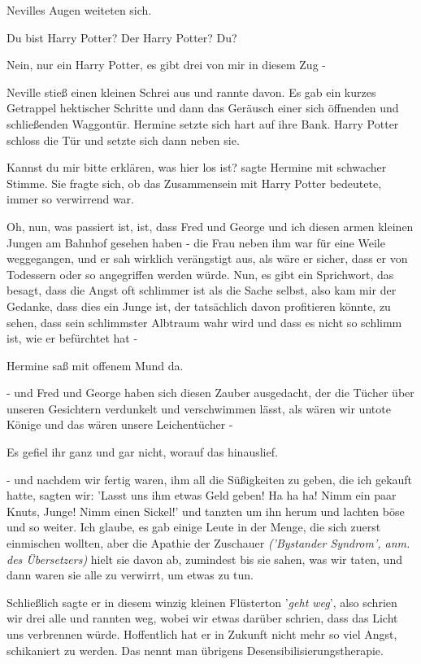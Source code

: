 Nevilles Augen weiteten sich.

\glqq{}Du bist Harry Potter? Der Harry Potter? Du?\grqq{}

\glqq{}Nein, nur ein Harry Potter, es gibt drei von mir in diesem Zug -\grqq{}

Neville stieß einen kleinen Schrei aus und rannte davon. Es gab ein kurzes
Getrappel hektischer Schritte und dann das Geräusch einer sich öffnenden und
schließenden Waggontür. Hermine setzte sich hart auf ihre Bank. Harry Potter
schloss die Tür und setzte sich dann neben sie.

\glqq{}Kannst du mir bitte erklären, was hier los ist?\grqq{} sagte Hermine mit
schwacher Stimme. Sie fragte sich, ob das Zusammensein mit Harry Potter
bedeutete, immer so verwirrend war.

\glqq{}Oh, nun, was passiert ist, ist, dass Fred und George und ich diesen armen
kleinen Jungen am Bahnhof gesehen haben - die Frau neben ihm war für eine Weile
weggegangen, und er sah wirklich verängstigt aus, als wäre er sicher, dass er
von Todessern oder so angegriffen werden würde. Nun, es gibt ein Sprichwort, das
besagt, dass die Angst oft schlimmer ist als die Sache selbst, also kam mir der
Gedanke, dass dies ein Junge ist, der tatsächlich davon profitieren könnte, zu
sehen, dass sein schlimmster Albtraum wahr wird und dass es nicht so schlimm
ist, wie er befürchtet hat -\grqq{}

Hermine saß mit offenem Mund da.

\glqq{}- und Fred und George haben sich diesen Zauber ausgedacht, der die Tücher
über unseren Gesichtern verdunkelt und verschwimmen lässt, als wären wir untote
Könige und das wären unsere Leichentücher -\grqq{}

Es gefiel ihr ganz und gar nicht, worauf das hinauslief.

\glqq{}- und nachdem wir fertig waren, ihm all die Süßigkeiten zu geben, die ich
gekauft hatte, sagten wir: 'Lasst uns ihm etwas Geld geben! Ha ha ha! Nimm ein
paar Knuts, Junge! Nimm einen Sickel!' und tanzten um ihn herum und lachten böse
und so weiter. Ich glaube, es gab einige Leute in der Menge, die sich zuerst
einmischen wollten, aber die Apathie der Zuschauer \emph{('Bystander Syndrom',
anm. des Übersetzers)} hielt sie davon ab, zumindest bis sie sahen, was wir
taten, und dann waren sie alle zu verwirrt, um etwas zu tun.

Schließlich sagte er in diesem winzig kleinen Flüsterton '\emph{geht weg}', also
schrien wir drei alle und rannten weg, wobei wir etwas darüber schrien, dass das
Licht uns verbrennen würde. Hoffentlich hat er in Zukunft nicht mehr so viel
Angst, schikaniert zu werden. Das nennt man übrigens
Desensibilisierungstherapie.\grqq{}

